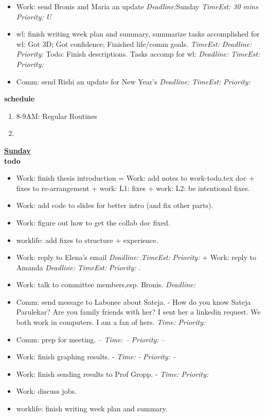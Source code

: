 \documentclass[11pt]{article}
\newcommand{\timeEst}[1]{\textit{Time:} \textit{#1}}
\newcommand{\te}[1]{\textit{TimeEst:} \textit{#1}}
\newcommand{\priority}[1]{\textit{Priority:} \textit{#1}}
\newcommand{\pr}[1]{\textit{Priority:} \textit{#1}}
\newcommand{\deadline}[1]{#1}
\newcommand{\dl}[1]{\textit{Deadline:}#1}
\begin{document}
{\begin{itemize}
  \item \tiny Work: send Bronis and Maria an update \dl{Sunday} \te{30 mins} \pr{U} 
  \item \tiny wl: finish writing week plan and summary, summarize tasks accomplished for wl: Got 3D; Got confidence; Finished life/comm goals. \te{}  \dl{} \pr{} 
    Todo: Finish descriptions. Tasks accomp for wl: \dl{}  \te{}  \pr{} 
  \item \tiny Comm: send Rishi an update for New Year's \dl{} \te{} \pr{} 
  \end{itemize}
  
  \textbf{\small schedule} \\
  \begin{enumerate}
    \tiny \item \tiny 8-9AM: Regular Routines 
  \item \tiny 
  \end{enumerate} 
  \textbf{\small \underline{Sunday}} \\
  \textbf{\small todo} \\
  \begin{itemize}
  \item \tiny Work: finish thesis introduction = Work: add notes to work-todo.tex doc +  fixes to re-arrangement + work: L1: fixes + work: L2: be intentional fixes. 
  \item \tiny Work: add code to slides for better intro (and fix other parts). 
  \item \tiny Work: figure out how to get the collab doc fixed. 
  \item \tiny worklife: add fixes to structure + experience. 
  \item \tiny Work: reply to Elena's email \dl{} \te{} \pr{} +  Work: reply to Amanda \dl{} \te{} \pr{} .
  \item \tiny Work: talk to committee members,esp. Bronis.  \dl{} 

    \tiny \item \tiny Comm: send message to Labonee about Sateja. - How do you know Sateja Parulekar? Are you family friends with her? I sent her a linkedin request. We both work in computers. I am a fan of hers. \deadline{} \timeEst{} \priority{}  

    \tiny \item \tiny Comm: prep for meeting. \deadline{--} \timeEst{--} \priority{--}  
  \item \tiny Work: finish graphing results.  \deadline{-}   \timeEst{-}  \priority{-}
  \item \tiny Work: finish sending results to Prof Gropp.  \deadline{-}   \timeEst{}  \priority{}  
  \item \tiny Work: discuss jobs.  
  \item \tiny worklife: finish writing week plan and summary. 
 

\end{itemize}}
\end{document}
